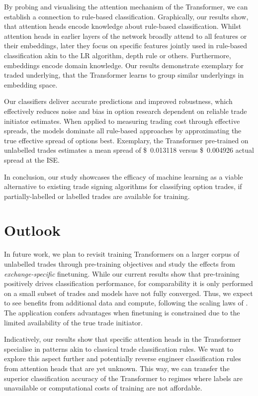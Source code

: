 By probing and visualising the attention mechanism of the Transformer, we can establish a connection to rule-based classification. Graphically, our results show, that attention heads encode knowledge about rule-based classification. Whilst attention heads in earlier layers of the network broadly attend to all features or their embeddings, later they focus on specific features jointly used in rule-based classification akin to the \gls{LR} algorithm, depth rule or others. Furthermore, embeddings encode domain knowledge. Our results demonstrate exemplary for traded underlying, that the Transformer learns to group similar underlyings in embedding space.

Our classifiers deliver accurate predictions and improved robustness, which effectively reduces noise and bias in option research dependent on reliable trade initiator estimates. When applied to measuring trading cost through effective spreads, the models dominate all rule-based approaches by approximating the true effective spread of options best. Exemplary, the Transformer pre-trained on unlabelled trades estimates a mean spread of  \SI[round-mode=places, round-precision=3]{0.013118}[\$]{} versus \SI[round-mode=places, round-precision=3]{0.004926}[\$]{} actual spread at the \gls{ISE}.

In conclusion, our study showcases the efficacy of machine learning as a viable alternative to existing trade signing algorithms for classifying option trades, if partially-labelled or labelled trades are available for training. %

\newpage
\section{Outlook}\label{sec:outlook}

In future work, we plan to revisit training Transformers on a larger corpus of unlabelled trades through pre-training objectives and study the effects from \emph{exchange-specific} finetuning. While our current results show that pre-training positively drives classification performance, for comparability it is only performed on a small subset of trades and models have not fully converged. Thus, we expect to see benefits from additional data and compute, following the scaling laws of \textcite[][7]{hoffmannTrainingComputeOptimalLarge2022}. The application confers advantages when finetuning is constrained due to the limited availability of the true trade initiator.

Indicatively, our results show that specific attention heads in the Transformer specialise in patterns akin to classical trade classification rules. We want to explore this aspect further and potentially reverse engineer classification rules from attention heads that are yet unknown. This way, we can transfer the superior classification accuracy of the Transformer to regimes where labels are unavailable or computational costs of training are not affordable.